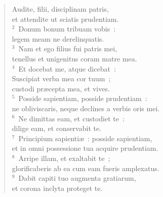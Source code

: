 \begin{flushleft}\begin{verse}\vspace{-19pt}Audite, filii, disciplinam patris,\\ et attendite ut sciatis prudentiam.\\
${}^{2}$~Donum bonum tribuam vobis~:\\ legem meam ne derelinquatis.\\
${}^{3}$~Nam et ego filius fui patris mei,\\ tenellus et unigenitus coram matre mea.\\
${}^{4}$~Et docebat me, atque dicebat~:\\ Suscipiat verba mea cor tuum~;\\ custodi pr\ae cepta mea, et vives.\\
${}^{5}$~Posside sapientiam, posside prudentiam~:\\ ne obliviscaris, neque declines a verbis oris mei.\\
${}^{6}$~Ne dimittas eam, et custodiet te~:\\ dilige eam, et conservabit te.\\
${}^{7}$~Principium sapienti\ae~: posside sapientiam,\\ et in omni possessione tua acquire prudentiam.\\
${}^{8}$~Arripe illam, et exaltabit te~;\\ glorificaberis ab ea cum eam fueris amplexatus.\\
${}^{9}$~Dabit capiti tuo augmenta gratiarum,\\ et corona inclyta proteget te.\end{verse}\end{flushleft}


